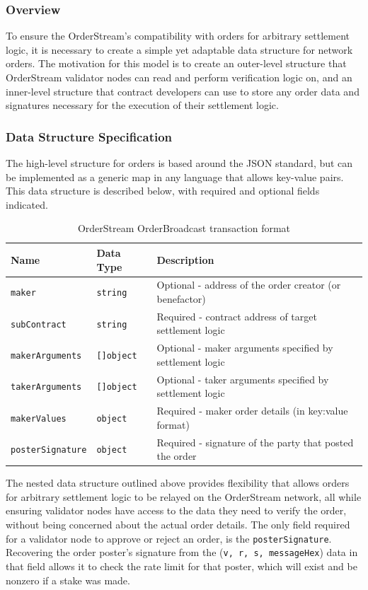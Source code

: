 \documentclass[9pt]{article}
\begin{document}
\subsubsection{Overview}
\noindent To ensure the OrderStream’s compatibility with orders for arbitrary settlement logic, it is necessary to create a simple yet adaptable data structure for network orders. The motivation for this model is to create an outer-level structure that OrderStream validator nodes can read and perform verification logic on, and an inner-level structure that contract developers can use to store any order data and signatures necessary for the execution of their settlement logic. 
 
\subsubsection{Data Structure Specification}
\noindent The high-level structure for orders is based around the JSON standard, but can be implemented as a generic map in any language that allows key-value pairs. This data structure is described below, with required and optional fields indicated. 

\begin{table}[h]
\centering
\caption{OrderStream OrderBroadcast transaction format }
\label{table:table1}
\begin{tabular}{|l|l|l|}
\hline
\textbf{Name} & \textbf{Data Type} & \textbf{Description} \\ \hline
\texttt{maker} & \texttt{string} & Optional - address of the order creator (or benefactor)\\ \hline
\texttt{subContract} & \texttt{string} & Required - contract address of target settlement logic \\ \hline
\texttt{makerArguments} & \texttt{[]object} & Optional - maker arguments specified by settlement logic  \\ \hline
\texttt{takerArguments} & \texttt{[]object} & Optional - taker arguments specified by settlement logic \\ \hline
\texttt{makerValues} & \texttt{object} & Required - maker order details (in key:value format) \\ \hline
\texttt{posterSignature} & \texttt{object} & Required - signature of the party that posted the order \\ \hline
\end{tabular}
\end{table}

\noindent The nested data structure outlined above provides flexibility that allows orders for arbitrary settlement logic to be relayed on the OrderStream network, all while ensuring validator nodes have access to the data they need to verify the order, without being concerned about the actual order details. The only field required for a validator node to approve or reject an order, is the \texttt{posterSignature}. Recovering the order poster's signature from the (\texttt{v, r, s, messageHex}) data in that field allows it to check the rate limit for that poster, which will exist and be nonzero if a stake was made. \\
\end{document}

